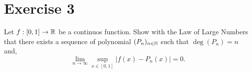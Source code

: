 \section{Exercise 3}
Let $f : [0,1]\to \mathbb{R}$ be a continuos function. Show with the Law of Large Numbers that there exists a sequence of polynomial $(P_n)_{n\in \mathbb{N}}$ such that $\deg(P_n) = n$ and,
\[ \lim_{n\to\infty} \sup_{x\in [0,1]} |f(x) - P_n(x)| = 0. \]